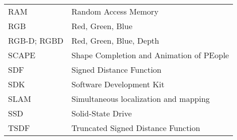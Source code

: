 \begin{longtable}{@{}p{}p{}@{}}
        RAM & Random Access Memory \\
        RGB & Red, Green, Blue \\
RGB-D; RGBD & Red, Green, Blue, Depth \\
      SCAPE & Shape Completion and Animation of PEople \\
        SDF & Signed Distance Function \\
        SDK & Software Development Kit \\
       SLAM & Simultaneous localization and mapping \\
        SSD & Solid-State Drive \\
       TSDF & Truncated Signed Distance Function \\
\end{longtable}

